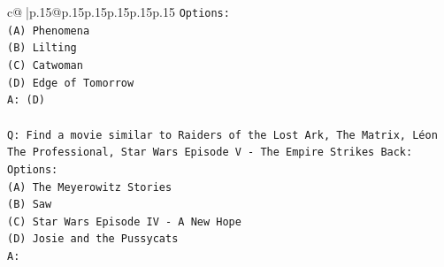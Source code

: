 \documentclass{article}
\begin{document}
{\begin{supertabular}{c@{$\;$}|p{.15\linewidth}@{}p{.15\linewidth}p{.15\linewidth}p{.15\linewidth}p{.15\linewidth}p{.15\linewidth}}
{{{\texttt{Options:} \\
\texttt{(A) Phenomena} \\
\texttt{(B) Lilting} \\
\texttt{(C) Catwoman} \\
\texttt{(D) Edge of Tomorrow} \\
\texttt{A: (D)} \\
\\ 
\texttt{Q: Find a movie similar to Raiders of the Lost Ark, The Matrix, Léon The Professional, Star Wars Episode V {-} The Empire Strikes Back:} \\
\texttt{Options:} \\
\texttt{(A) The Meyerowitz Stories} \\
\texttt{(B) Saw} \\
\texttt{(C) Star Wars Episode IV {-} A New Hope} \\
\texttt{(D) Josie and the Pussycats} \\
\texttt{A:} \\
            }
        }
    }
     \\ \\


\end{supertabular}}
\end{document}
